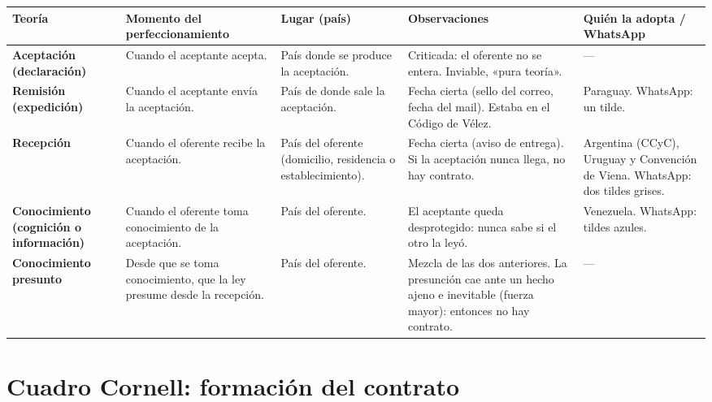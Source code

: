 \documentclass[12pt,oneside]{book}
\begin{document}
\begin{table}[H]
\centering
\footnotesize
\setlength{\tabcolsep}{4pt}
\begin{tabular}{@{}L{0.14\textwidth}L{0.16\textwidth}L{0.15\textwidth}L{0.24\textwidth}L{0.18\textwidth}@{}}
\toprule
\textbf{Teoría} & \textbf{Momento del perfeccionamiento} & \textbf{Lugar (país)} & \textbf{Observaciones} & \textbf{Quién la adopta / WhatsApp} \\
\midrule
\textbf{Aceptación (declaración)} & Cuando el aceptante acepta. & País donde se produce la aceptación. & Criticada: el oferente no se entera. Inviable, «pura teoría». & --- \\
\addlinespace
\textbf{Remisión (expedición)} & Cuando el aceptante envía la aceptación. & País de donde sale la aceptación. & Fecha cierta (sello del correo, fecha del mail). Estaba en el Código de Vélez. & Paraguay. WhatsApp: un tilde. \\
\addlinespace
\textbf{Recepción} & Cuando el oferente recibe la aceptación. & País del oferente (domicilio, residencia o establecimiento). & Fecha cierta (aviso de entrega). Si la aceptación nunca llega, no hay contrato. & Argentina (CCyC), Uruguay y Convención de Viena. WhatsApp: dos tildes grises. \\
\addlinespace
\textbf{Conocimiento (cognición o información)} & Cuando el oferente toma conocimiento de la aceptación. & País del oferente. & El aceptante queda desprotegido: nunca sabe si el otro la leyó. & Venezuela. WhatsApp: tildes azules. \\
\addlinespace
\textbf{Conocimiento presunto} & Desde que se toma conocimiento, que la ley presume desde la recepción. & País del oferente. & Mezcla de las dos anteriores. La presunción cae ante un hecho ajeno e inevitable (fuerza mayor): entonces no hay contrato. & --- \\
\bottomrule
\end{tabular}
\end{table}

\section{Cuadro Cornell: formación del contrato}
\end{document}

